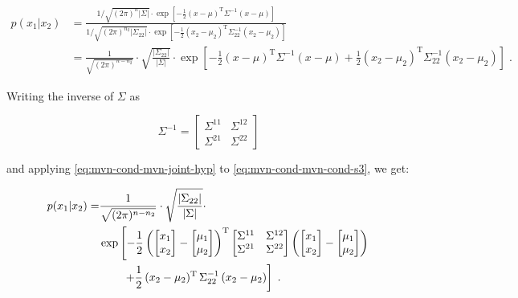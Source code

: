 \documentclass[a4paper,12pt,twoside]{book}
\begin{document}
\begin{equation} \label{eq:mvn-cond-mvn-cond-s3}
\begin{split}
p(x_1|x_2) &= \frac{1/\sqrt{(2 \pi)^n |\Sigma|} \cdot \exp \left[ -\frac{1}{2} (x-\mu)^\mathrm{T} \Sigma^{-1} (x-\mu) \right]}{1/\sqrt{(2 \pi)^{n_2} |\Sigma_{22}|} \cdot \exp \left[ -\frac{1}{2} (x_2-\mu_2)^\mathrm{T} \Sigma_{22}^{-1} (x_2-\mu_2) \right]} \\
&= \frac{1}{\sqrt{(2 \pi)^{n-n_2}}} \cdot \sqrt{\frac{|\Sigma_{22}|}{|\Sigma|}} \cdot \exp \left[ -\frac{1}{2} (x-\mu)^\mathrm{T} \Sigma^{-1} (x-\mu) + \frac{1}{2} (x_2-\mu_2)^\mathrm{T} \Sigma_{22}^{-1} (x_2-\mu_2) \right] \; .
\end{split}
\end{equation}

Writing the inverse of $\Sigma$ as

\begin{equation} \label{eq:mvn-cond-Sigma-inv-def}
\Sigma^{-1} = \begin{bmatrix} \Sigma^{11} & \Sigma^{12} \\ \Sigma^{21} & \Sigma^{22} \end{bmatrix}
\end{equation}

and applying \eqref{eq:mvn-cond-mvn-joint-hyp} to \eqref{eq:mvn-cond-mvn-cond-s3}, we get:

\begin{equation} \label{eq:mvn-cond-mvn-cond-s4}
\begin{split}
p(x_1|x_2) = &\frac{1}{\sqrt{(2 \pi)^{n-n_2}}} \cdot \sqrt{\frac{|\Sigma_{22}|}{|\Sigma|}} \cdot \\
&\exp \left[ -\frac{1}{2} \left( \begin{bmatrix} x_1 \\ x_2 \end{bmatrix} - \begin{bmatrix} \mu_1 \\ \mu_2 \end{bmatrix} \right)^\mathrm{T} \begin{bmatrix} \Sigma^{11} & \Sigma^{12} \\ \Sigma^{21} & \Sigma^{22} \end{bmatrix} \left( \begin{bmatrix} x_1 \\ x_2 \end{bmatrix} - \begin{bmatrix} \mu_1 \\ \mu_2 \end{bmatrix} \right) \right. \\
&\hphantom{\exp \left[\right.} \left. + \frac{1}{2} \, (x_2-\mu_2)^\mathrm{T} \, \Sigma_{22}^{-1} \, (x_2-\mu_2) \right] \; .
\end{split}
\end{equation}
\end{document}
